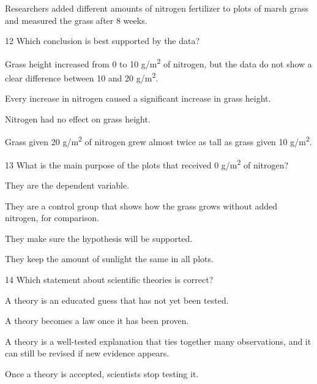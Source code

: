 \documentclass[11pt,letterpaper]{article}
\begin{document}

Researchers added different amounts of nitrogen fertilizer to plots of marsh grass and measured the grass after 8 weeks.


\begin{mcq}{12}
Which conclusion is best supported by the data?
\begin{choices}
  \item Grass height increased from 0 to 10 g/m\textsuperscript{2} of nitrogen, but the data do not show a clear difference between 10 and 20 g/m\textsuperscript{2}.
  \item Every increase in nitrogen caused a significant increase in grass height.
  \item Nitrogen had no effect on grass height.
  \item Grass given 20 g/m\textsuperscript{2} of nitrogen grew almost twice as tall as grass given 10 g/m\textsuperscript{2}.
\end{choices}
\end{mcq}

\begin{mcq}{13}
What is the main purpose of the plots that received 0 g/m\textsuperscript{2} of nitrogen?
\begin{choices}
  \item They are the dependent variable.
  \item They are a control group that shows how the grass grows without added nitrogen, for comparison.
  \item They make sure the hypothesis will be supported.
  \item They keep the amount of sunlight the same in all plots.
\end{choices}
\end{mcq}


\begin{mcq}{14}
Which statement about scientific theories is correct?
\begin{choices}
  \item A theory is an educated guess that has not yet been tested.
  \item A theory becomes a law once it has been proven.
  \item A theory is a well-tested explanation that ties together many observations, and it can still be revised if new evidence appears.
  \item Once a theory is accepted, scientists stop testing it.
\end{choices}
\end{mcq}
\end{document}
